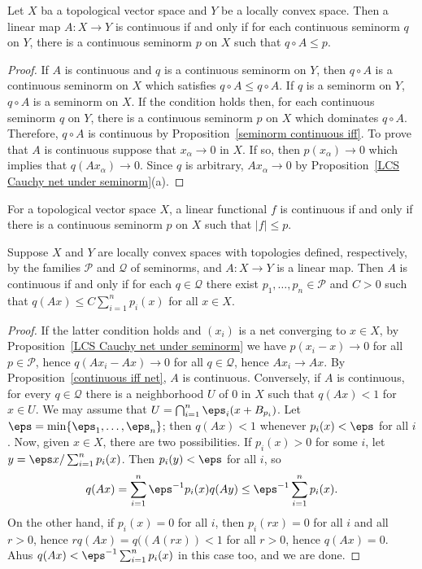 \begin{proposition}\label{LCS as image continuity iff}
Let $X$ ba a topological vector space and $Y$ be a locally convex space. Then a linear map $A:X\to Y$ is continuous if and only if for each continuous seminorm $q$ on $Y$, there is a continuous seminorm $p$ on $X$ such that $q\circ A\leq p$.
\end{proposition}
\begin{proof}
If $A$ is continuous and $q$ is a continuous seminorm on $Y$, then $q\circ A$ is a continuous seminorm on $X$ which satisfies $q\circ A\leq q\circ A$. If $q$ is a seminorm on $Y$, $q\circ A$ is a seminorm on $X$. If the condition holds then, for each continuous seminorm $q$ on $Y$, there is a continuous seminorm $p$ on $X$ which dominates $q\circ A$. Therefore, $q\circ A$ is continuous by Proposition~\ref{seminorm continuous iff}. To prove that $A$ is continuous suppose that $x_\alpha\to 0$ in $X$. If so, then $p(x_\alpha)\to 0$ which implies that $q(Ax_\alpha)\to 0$. Since $q$ is arbitrary, $Ax_\alpha\to 0$ by Proposition~\ref{LCS Cauchy net under seminorm}(a).
\end{proof}
\begin{corollary}\label{TVS linear functional iff seminorm}
For a topological vector space $X$, a linear functional $f$ is continuous if and only if there is a continuous seminorm $p$ on $X$ such that $|f|\leq p$.
\end{corollary}
\begin{proposition}\label{LCS by seminorm continuous iff}
Suppose $X$ and $Y$ are locally convex spaces with topologies defined, respectively, by the families $\mathscr{P}$ and $\mathscr{Q}$ of seminorms, and $A:X\to Y$ is a linear map. Then $A$ is continuous if and only if for each $q\in\mathscr{Q}$ there exist $p_1,\dots,p_n\in\mathscr{P}$ and $C>0$ such that $q(Ax)\leq C\sum_{i=1}^{n}p_i(x)$ for all $x\in X$.
\end{proposition}
\begin{proof}
If the latter condition holds and $(x_i)$ is a net converging to $x\in X$, by Proposition~\ref{LCS Cauchy net under seminorm} we have $p(x_i-x)\to 0$ for all $p\in\mathscr{P}$, hence $q(Ax_i-Ax)\to 0$ for all $q\in\mathscr{Q}$, hence $Ax_i\to Ax$. By Proposition~\ref{continuous iff net}, $A$ is continuous. Conversely, if $A$ is continuous, for every $q\in\mathscr{Q}$ there is a neighborhood $U$ of $0$ in $X$ such that $q(Ax)<1$ for $x\in U$. We may assume that $U=\bigcap_{i=1}^{n}\eps_i(x+B_{p_i})$. Let $\eps=\min\{\eps_1,\dots,\eps_n\}$; then $q(Ax)<1$ whenever $p_i(x)<\eps$ for all $i$. Now, given $x\in X$, there are two possibilities. If $p_i(x)>0$ for some $i$, let $y=\eps x/\sum_{i=1}^{n}p_i(x)$. Then $p_i(y)<\eps$ for all $i$, so
\[q(Ax)=\sum_{i=1}^{n}\eps^{-1}p_i(x)q(Ay)\leq\eps^{-1}\sum_{i=1}^{n}p_i(x).\]
On the other hand, if $p_i(x)=0$ for all $i$, then $p_i(rx)=0$ for all $i$ and all $r>0$, hence $rq(Ax)=q((A(rx))<1$ for all $r>0$, hence $q(Ax)=0$. Ahus $q(Ax)<\eps^{-1}\sum_{i=1}^{n}p_i(x)$ in this case too, and we are done.
\end{proof}
